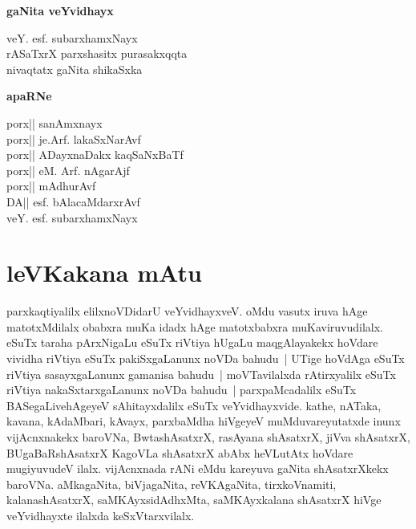 \begin{center}
\textbf{\large{gaNita veYvidhayx}}
\end{center}

\vfill

\begin{center}
veY. esf. subarxhamxNayx\\
rASaTxrX parxshasitx purasakxqqta\\
nivaqtatx gaNita shikaSxka
\end{center}

\vfill

\newpage

\begin{center}
\textbf{\large{apaRNe}}
\end{center}

\begin{center}
porx|| sanAmxnayx\\
porx|| je.Arf. lakaSxNarAvf\\
porx|| ADayxnaDakx kaqSaNxBaTf\\
porx|| eM. Arf. nAgarAjf\\
porx|| mAdhurAvf\\
DA|| esf. bAlacaMdarxrAvf\\
veY. esf. subarxhamxNayx
\end{center}

\newpage

\chapter*{leVKakana mAtu}

parxkaqtiyalilx elilxnoVDidarU veYvidhayxveV. oMdu vasutx iruva hAge matotxMdilalx obabxra\- muKa idadx hAge matotxbabxra muKaviruvudilalx. eSuTx taraha pArxNigaLu eSuTx\- riVtiya hUgaLu maqgAlayakekx hoVdare vividha riVtiya eSuTx pakiSxgaLanunx noVDa bahudu~| UTige hoVdAga eSuTx riVtiya sasayxgaLanunx gamanisa bahudu~| moVTavilalxda rAtirx\-yalilx eSuTx riVtiya nakaSxtarxgaLanunx noVDa bahudu~| parxpaMcadalilx eSuTx BASegaLive\break hAgeyeV sAhitayxdalilx eSuTx veYvidhayxvide. kathe, nATaka, kavana, kAdaMbari, kAvayx, parxbaMdha hiVgeyeV muMduvareyutatxde inunx vijAcnxnakekx baroVNa, BwtashAsatxrX, rasAyana shAsatxrX, jiVva shAsatxrX, BUgaBaRshAsatxrX KagoVLa shAsatxrX abAbx heVLutAtx hoVdare mugiyuvudeV ilalx. \-vijAcnxnada rANi eMdu kareyuva gaNita shAsatxrXkekx baroVNa. aMkagaNita, biVjagaNita,\- reVKAgaNita, tirxkoVnamiti, kalanashAsatxrX, saMKAyxsidAdhxMta, saMKAyxkalana shAsatxrX hiVge \-veYvidhayxte ilalxda keSxVtarxvilalx.

